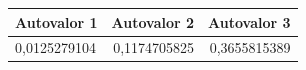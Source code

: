 \begin{tabular}{lrr}
\toprule
Autovalor 1 & Autovalor 2 & Autovalor 3 \\
\midrule
0,0125279104 & 0,1174705825 & 0,3655815389 \\
\bottomrule
\end{tabular}
